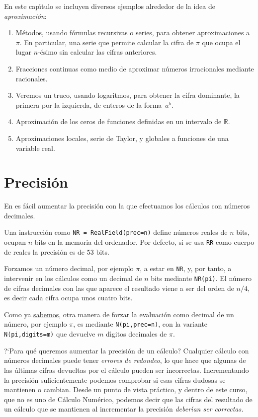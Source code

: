 En este
cap\'{\i}tulo se incluyen diversos ejemplos alrededor de la idea de {\itshape
aproximaci\'on}:
\begin{enumerate}
 \item M\'etodos, usando f\'ormulas recursivas o
series, para obtener
aproximaciones a $\pi$. En particular, una serie que permite calcular la cifra
de $\pi$ que ocupa el lugar $n$-\'esimo sin calcular las cifras anteriores. 

\item Fracciones continuas como medio
de aproximar n\'umeros irracionales mediante racionales. 
\item Veremos un truco, usando logaritmos, para obtener la cifra dominante, la
primera por la izquierda,  de enteros de la forma~$a^b$. 
\item Aproximaci\'on de los ceros de funciones definidas en un intervalo de
$\mathbb{R}$.

\item Aproximaciones locales, serie de Taylor, y globales a funciones de una
variable real.
\end{enumerate}

\section{Precisi\'on} 

En {\sage} es f\'acil aumentar la precisi\'on con la que efectuamos los
c\'alculos con n\'umeros decimales.

Una instrucci\'on como \lstinline|NR = RealField(prec=n)| define n\'umeros
reales de $n$ bits, ocupan $n$ bits en la memoria del ordenador. Por defecto,
si se usa {\tt RR} como cuerpo de reales la precisi\'on es de $53$ bits. 

Forzamos un n\'umero decimal, por ejemplo $\pi$,  a estar en {\tt NR}, y, por
tanto, a intervenir en los c\'alculos como un decimal de $n$ bits mediante
\lstinline|NR(pi)|.  El n\'umero de cifras decimales con las que aparece el
resultado viene a ser del orden de $n/4$, es decir cada cifra ocupa unos cuatro
bits. 


Como ya \hyperref[num]{sabemos}, otra manera de forzar la evaluaci\'on como
decimal de un n\'umero, por ejemplo $\pi$,  es mediante
\lstinline|N(pi,prec=n)|, con la variante \lstinline|N(pi,digits=m)| que
devuelve $m$ d\'{\i}gitos decimales de $\pi$.

?`Para qu\'e queremos aumentar la precisi\'on de un c\'alculo? Cualquier
c\'alculo con n\'umeros decimales puede tener {\itshape errores de redondeo},
lo que hace que algunas de las \'ultimas cifras devueltas por el c\'alculo
pueden ser incorrectas. Incrementando la precisi\'on suficientemente podemos
comprobar si esas cifras dudosas se mantienen o cambian. Desde un punto de
vista pr\'actico, y dentro de este curso, que no es uno de C\'alculo
Num\'erico, podemos decir que las cifras del resultado de un c\'alculo que se
mantienen al incrementar la precisi\'on {\itshape deber\'{\i}an ser correctas.}

